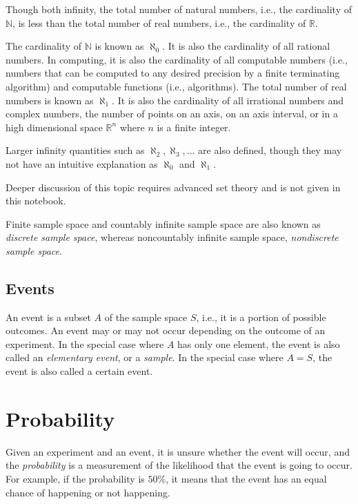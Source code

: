 \begin{shortbox}
Though both infinity, the total number of natural numbers, i.e., the cardinality of $\mathbb{N}$, is less than the total number of real numbers, i.e., the cardinality of $\mathbb{R}$.

The cardinality of $\mathbb{N}$ is known as $\aleph_0$. It is also the cardinality of all rational numbers. In computing, it is also the cardinality of all computable numbers (i.e., numbers that can be computed to any desired precision by a finite terminating algorithm) and computable functions (i.e., algorithms). The total number of real numbers is known as $\aleph_1$. It is also the cardinality of all irrational numbers and complex numbers, the number of points on an axis, on an axis interval, or in a high dimensional space $\mathbb{R}^n$ where $n$ is a finite integer.

Larger infinity quantities such as $\aleph_2, \aleph_3, \ldots$ are also defined, though they may not have an intuitive explanation as $\aleph_0$ and $\aleph_1$.

Deeper discussion of this topic requires advanced set theory and is not given in this notebook.
\end{shortbox}

Finite sample space and countably infinite sample space are also known as \textit{discrete sample space}, whereas noncountably infinite sample space, \textit{nondiscrete sample space}.


\subsection{Events}

An event is a subset $A$ of the sample space $S$, i.e., it is a portion of possible outcomes. An event may or may not occur depending on the outcome of an experiment. In the special case where $A$ has only one element, the event is also called an \textit{elementary event}, or a \textit{sample}. In the special case where $A=S$, the event is also called a certain event.

\section{Probability}

Given an experiment and an event, it is unsure whether the event will occur, and the \textit{probability} is a measurement of the likelihood that the event is going to occur. For example, if the probability is $50\%$, it means that the event has an equal chance of happening or not happening.


